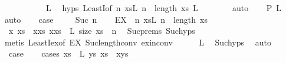 \begin{isabellebody}
\ \ \isamarkupfalse%
\ {}\isanewline
\ \ \isamarkupfalse%
\ {\isachardoublequoteopen}{\isacharbrackleft}{\isacharbrackright}\ {\isasymin}\ L{\isachardoublequoteclose}\ \isamarkupfalse%
\ {\isachardoublequoteopen}{}{\isachardot}hyps{\isachardoublequoteclose}\ LeastI{\isacharbrackleft}of\ {\isachardoublequoteopen}{\isasymlambda}n{\isachardot}\ {\isasymexists}xs{\isasymin}L{\isachardot}\ n\ {\isacharequal}\ length\ xs{\isachardoublequoteclose}{\isacharbrackright}\ {\isacartoucheopen}L\ {\isasymnoteq}\ {\isacharbraceleft}{\isacharbraceright}{\isacartoucheclose}\isanewline
\ \ \ \ \isamarkupfalse%
\ auto\isanewline
\ \ \isamarkupfalse%
\ {\isachardoublequoteopen}{\isacharquery}P\ L\ {\isacharbrackleft}{\isacharbrackright}{\isachardoublequoteclose}\ \isamarkupfalse%
{\isacharparenleft}auto{\isacharparenright}\isanewline
\ \ \isamarkupfalse%
\ {\isacharquery}case\ \isacommand{{\isachardot}{\isachardot}}\isamarkupfalse%
\isanewline
{}\isamarkupfalse%
\isanewline
\ \ \isamarkupfalse%
\ {\isacharparenleft}Suc\ n{\isacharparenright}\isanewline
\ \ \isamarkupfalse%
\ {\isacharquery}EX\ {\isacharequal}\ {\isachardoublequoteopen}{\isasymlambda}n{\isachardot}\ {\isasymexists}xs{\isasymin}L{\isachardot}\ n\ {\isacharequal}\ length\ xs{\isachardoublequoteclose}\isanewline
\ \ \isamarkupfalse%
\ x\ xs\ \ xxs{\isacharcolon}\ {\isachardoublequoteopen}x{\isacharhash}xs\ {\isasymin}\ L{\isachardoublequoteclose}\ {\isachardoublequoteopen}size\ xs\ {\isacharequal}\ n{\isachardoublequoteclose}\ \isamarkupfalse%
\ Suc{\isachardot}prems\ Suc{\isachardot}hyps{\isacharparenleft}{}{\isacharparenright}\isanewline
\ \ \ \ \isamarkupfalse%
{\isacharparenleft}metis\ LeastI{\isacharunderscore}ex{\isacharbrackleft}of\ {\isacharquery}EX{\isacharbrackright}\ Suc{\isacharunderscore}length{\isacharunderscore}conv\ ex{\isacharunderscore}in{\isacharunderscore}conv{\isacharparenright}\isanewline
\ \ \isamarkupfalse%
\ {\isachardoublequoteopen}{\isacharbrackleft}{\isacharbrackright}\ {\isasymnotin}\ L{\isachardoublequoteclose}\ \isamarkupfalse%
\ Suc{\isachardot}hyps{\isacharparenleft}{}{\isacharparenright}\ \isamarkupfalse%
\ auto\isanewline
\ \ \isamarkupfalse%
\ {\isacharquery}case\isanewline
\ \ \isamarkupfalse%
\ {\isacharparenleft}cases\ {\isachardoublequoteopen}{\isasymforall}xs\ {\isasymin}\ L{\isachardot}\ {\isasymexists}ys{\isachardot}\ xs\ {\isacharequal}\ x{\isacharhash}ys{\isachardoublequoteclose}{\isacharparenright}\isanewline

\end{isabellebody}

